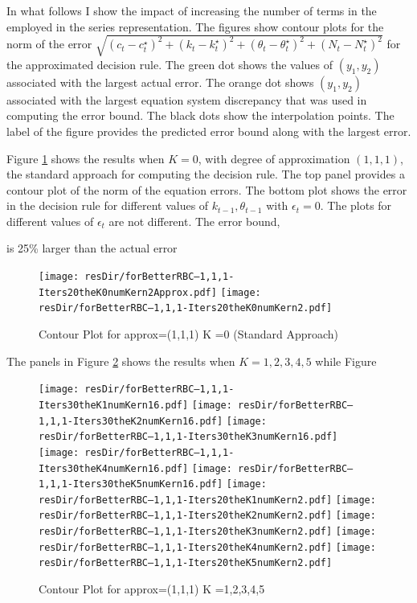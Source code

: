 \documentclass[12pt]{article}
\begin{document}
In what follows I show the impact of increasing the number of terms in the 
employed in the series representation.  
The figures  show contour plots for the norm of the error 
$\sqrt{(c_t-c_t^\star)^2 +(k_t-k_t^\star)^2 +(\theta_t-\theta_t^\star)^2 +(N_t-N_t^\star)^2 }$ for the approximated decision rule. The green dot shows the values of $(y_1,y_2)$ associated with the largest actual error.  The orange dot shows $(y_1,y_2)$ associated with  the largest equation system discrepancy 
that was used in computing the error bound. The black dots show the interpolation points. The label of the figure provides the predicted error bound along with the largest error.


Figure \ref{fig:cntpltA} shows the results when $K=0$, with degree of approximation $(1,1,1)$, the standard approach
for computing the decision rule.  The top panel provides a contour plot of the
norm of the equation errors. The bottom plot shows the error in the decision rule for different values of $k_{t-1}, \theta_{t-1}$ with $\epsilon_t=0$.  The plots for different values of $\epsilon_t$ are not different. The error bound, 
\ifmacosx
 
\fi
\iflinux
 
\fi
is 25\% larger than the actual error 
\ifmacosx

\fi
\iflinux

\fi
\begin{figure}
  \centering
\ifmacosx
  \texttt{[image: resDir/forBetterRBC--1,1,1-Iters20theK0numKern2Approx.pdf]}
  \texttt{[image: resDir/forBetterRBC--1,1,1-Iters20theK0numKern2.pdf]}
\fi
  \caption{Contour Plot for approx=(1,1,1) K =0 (Standard Approach)}
  \label{fig:cntpltA}
\end{figure}

The panels in Figure \ref{fig:cntpltB} shows the results when $K=1,2,3,4,5$
while Figure



\begin{figure}
  \centering
\iflinux
\texttt{[image: resDir/forBetterRBC--1,1,1-Iters30theK1numKern16.pdf]}
\texttt{[image: resDir/forBetterRBC--1,1,1-Iters30theK2numKern16.pdf]}
\texttt{[image: resDir/forBetterRBC--1,1,1-Iters30theK3numKern16.pdf]}
\texttt{[image: resDir/forBetterRBC--1,1,1-Iters30theK4numKern16.pdf]}
\texttt{[image: resDir/forBetterRBC--1,1,1-Iters30theK5numKern16.pdf]}
\fi
\ifmacosx
\texttt{[image: resDir/forBetterRBC--1,1,1-Iters20theK1numKern2.pdf]}
\texttt{[image: resDir/forBetterRBC--1,1,1-Iters20theK2numKern2.pdf]}
\texttt{[image: resDir/forBetterRBC--1,1,1-Iters20theK3numKern2.pdf]}
\texttt{[image: resDir/forBetterRBC--1,1,1-Iters20theK4numKern2.pdf]}
\texttt{[image: resDir/forBetterRBC--1,1,1-Iters20theK5numKern2.pdf]}
\fi
  \caption{Contour Plot for approx=(1,1,1)  K =1,2,3,4,5}
  \label{fig:cntpltB}
\end{figure}
\end{document}
